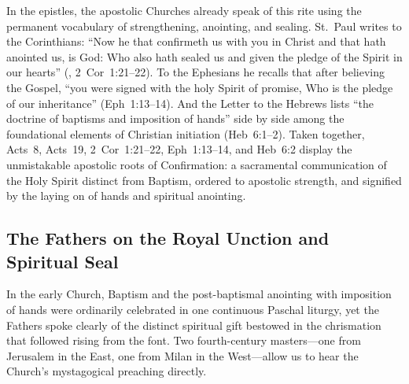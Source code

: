 In the epistles, the apostolic Churches already speak of this rite using the permanent vocabulary of strengthening, anointing, and sealing. St.~Paul writes to the Corinthians: ``Now he that confirmeth us with you in Christ and that hath anointed us, is God: Who also hath sealed us and given the pledge of the Spirit in our hearts'' (, 2~Cor~1:21--22). To the Ephesians he recalls that after believing the Gospel, ``you were signed with the holy Spirit of promise, Who is the pledge of our inheritance'' (Eph~1:13--14). And the Letter to the Hebrews lists ``the doctrine of baptisms and imposition of hands'' side by side among the foundational elements of Christian initiation (Heb~6:1--2). Taken together, Acts~8, Acts~19, 2~Cor~1:21--22, Eph~1:13--14, and Heb~6:2 display the unmistakable apostolic roots of Confirmation: a sacramental communication of the Holy Spirit distinct from Baptism, ordered to apostolic strength, and signified by the laying on of hands and spiritual anointing.

\subsection{The Fathers on the Royal Unction and Spiritual Seal}
\label{subsec:confirmation-fathers}

In the early Church, Baptism and the post-baptismal anointing with imposition of hands were ordinarily celebrated in one continuous Paschal liturgy, yet the Fathers spoke clearly of the distinct spiritual gift bestowed in the chrismation that followed rising from the font. Two fourth-century masters---one from Jerusalem in the East, one from Milan in the West---allow us to hear the Church's mystagogical preaching directly.

